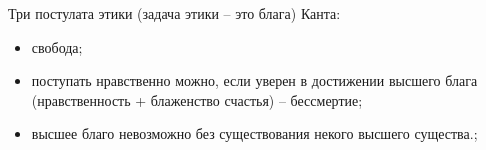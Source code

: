 \documentclass[a4paper, 12pt]{book} %
\begin{document}
Три постулата этики (задача этики -- это блага) Канта:
\begin{itemize}
\item свобода;
\item поступать нравственно можно, если уверен в достижении высшего блага (нравственность + блаженство счастья) -- бессмертие;
\item высшее благо невозможно без существования некого высшего существа.;
\end{itemize}


\tableofcontents 
\end{document}
